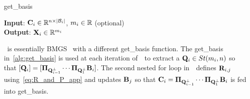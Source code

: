\begin{algorithm}[ht!]
\caption{get\_basis}\label{alg:get_basis}
 \textbf{Input}: {$\mathbf{C}_i \in \mathbb{R}^{n \times |\mathcal{B}_i|}$, $m_i \in \mathbb{R}$ (optional)}\\
 \textbf{Output}: {$\mathbf{X}_i \in \mathbb{R}^{m_i}$} \\[0.25em]
\end{algorithm}%

\algname~is essentially BMGS~\cite{jalby1991stability} with a different get\_basis function. The get\_basis in~\cref{alg:get_basis} is used at each iteration of~\algname~to extract a $\mathbf{Q}_i \in St(m_i,n)$ so that $[\mathbf{Q}_i] = [\boldsymbol{\Pi}_{\mathbf{Q}_{i-1}^\perp} \cdots \boldsymbol{\Pi}_{\mathbf{Q}_1^\perp}\mathbf{B}_i]$. The second nested for loop in~\algname~defines $\mathbf{R}_{i,j}$ using~\cref{eq:R_and_P_app} and updates $\mathbf{B}_j$ so that $\mathbf{C}_i = \boldsymbol{\Pi}_{\mathbf{Q}_{i-1}^\perp} \cdots \boldsymbol{\Pi}_{\mathbf{Q}_1^\perp}\mathbf{B}_i$ is fed into get\_basis. %

